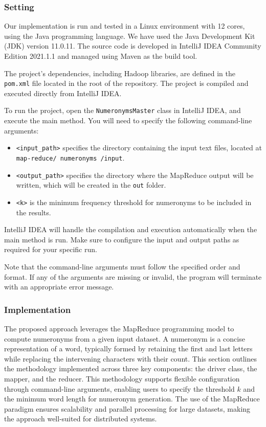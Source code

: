 \documentclass[acmlarge]{acmart}
\begin{document}
\subsubsection{Setting}
Our implementation is run and tested in a Linux environment with 12 cores, using the Java programming language.
We have used the Java Development Kit (JDK) version 11.0.11.
The source code is developed in IntelliJ IDEA Community Edition 2021.1.1 and managed using Maven as the build tool.

The project’s dependencies, including Hadoop libraries, are defined in the \texttt{pom.xml} file located in the root of
the repository.
The project is compiled and executed directly from IntelliJ IDEA.

To run the project, open the \texttt{NumeronymsMaster} class in IntelliJ IDEA, and execute the main method.
You will need to specify the following command-line arguments:

\begin{itemize}
  \item \texttt{<input\_path>} specifies the directory containing the input text files, located at
  \texttt{map-reduce/ numeronyms /input}.
  \item \texttt{<output\_path>} specifies the directory where the MapReduce output will be written, which will be created in the \texttt{out} folder.
  \item \texttt{<k>} is the minimum frequency threshold for numeronyms to be included in the results.
\end{itemize}

IntelliJ IDEA will handle the compilation and execution automatically when the main method is run.
Make sure to configure the input and output paths as required for your specific run.

Note that the command-line arguments must follow the specified order and format.
If any of the arguments are missing or invalid, the program will terminate with an appropriate error message.

\subsubsection{Implementation}
The proposed approach leverages the MapReduce programming model to compute numeronyms from a given input dataset.
A numeronym is a concise representation of a word, typically formed by retaining the first and last letters while
replacing the intervening characters with their count.
This section outlines the methodology implemented across three key components: the driver class, the mapper, and the
reducer.
This methodology supports flexible configuration through command-line arguments, enabling users to specify the
threshold $k$ and the minimum word length for numeronym generation.
The use of the MapReduce paradigm ensures scalability and parallel processing for large datasets, making the approach
well-suited for distributed systems.
\end{document}
